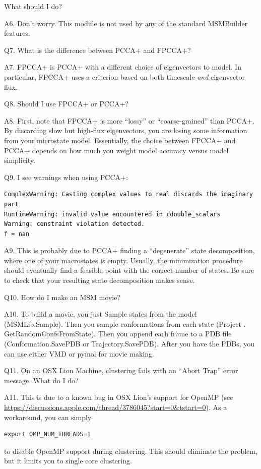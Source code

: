 \documentclass[12pt]{article}
\begin{document}
What should I do?

A6.  Don't worry.  This module is not used by any of the standard MSMBuilder features.  

\vspace{5mm}

Q7.  What is the difference between PCCA+ and FPCCA+?

A7.  FPCCA+ is PCCA+ with a different choice of eigenvectors to model.  In particular, FPCCA+ uses a criterion based on both timescale \emph{and} eigenvector flux.  

\vspace{5mm}

Q8.  Should I use FPCCA+ or PCCA+?

A8.  First, note that FPCCA+ is more ``lossy'' or ``coarse-grained'' than PCCA+.  By discarding slow but high-flux eigenvectors, you are losing some information from your microstate model.  Essentially, the choice between FPCCA+ and PCCA+ depends on how much you weight model accuracy versus model simplicity.  

\vspace{5mm}

Q9.  I see warnings when using PCCA+:
\begin{verbatim}
ComplexWarning: Casting complex values to real discards the imaginary part
RuntimeWarning: invalid value encountered in cdouble_scalars
Warning: constraint violation detected.
f = nan
 \end{verbatim}
 
A9.  This is probably due to PCCA+ finding a ``degenerate'' state decomposition, where one of your macrostates is empty.  Usually, the minimization procedure should eventually find a feasible point with the correct number of states.  Be sure to check that your resulting state decomposition makes sense.   

\vspace{5mm}

Q10.  How do I make an MSM movie?

A10. To build a movie, you just Sample states from the model (MSMLib.Sample).  Then you sample conformations from each state (Project . GetRandomConfsFromState).  Then you append each frame to a PDB file (Conformation.SavePDB or Trajectory.SavePDB).  After you have the PDBs, you can use either VMD or pymol for movie making.

\vspace{5mm}

Q11.  On an OSX Lion Machine, clustering fails with an ``Abort Trap'' error message.  What do I do?

A11.  This is due to a known bug in OSX Lion's support for OpenMP (see \url{https://discussions.apple.com/thread/3786045?start=0&tstart=0}).  As a workaround, you can simply 
\begin{verbatim}
export OMP_NUM_THREADS=1
\end{verbatim}
to disable OpenMP support during clustering.  This should eliminate the problem, but it limits you to single core clustering.  


\end{document}
